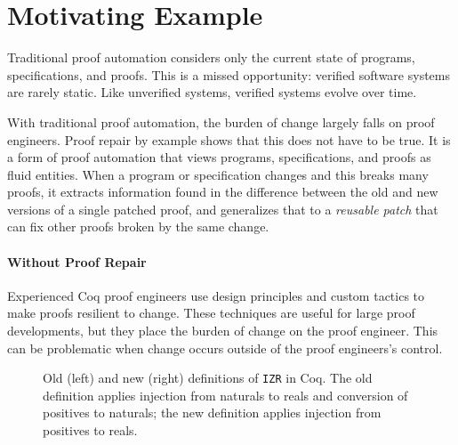 \section{Motivating Example}
\label{sec:patch-motivating}


Traditional proof automation considers only the current state of programs, specifications, and proofs.
This is a missed opportunity: verified software systems are rarely static.
Like unverified systems, verified systems evolve over time.

With traditional proof automation, the burden of change largely falls on proof engineers.
Proof repair by example shows that this does not have to be true.
It is a form of proof automation that views programs, specifications, and proofs as fluid entities.
When a program or specification changes and this breaks many proofs,
it extracts information found in the difference between the old and new versions of a single patched proof,
and generalizes that to a \emph{reusable patch} that can fix other proofs broken by the same change.

\paragraph{Without Proof Repair} Experienced Coq proof engineers use design principles and custom tactics to make proofs
resilient to change. These techniques are useful for large proof developments, but they
place the burden of change on the proof engineer. This can be problematic
when change occurs outside of the proof engineers's control.

\begin{figure*}
\begin{minipage}{0.55\textwidth}
\centering
\lstset{language=coq, aboveskip=0pt, belowskip=0pt}



\end{minipage}
\hfill
\begin{minipage}{0.44\textwidth}
\centering
\lstset{language=coq, aboveskip=0pt, belowskip=0pt}



\end{minipage}
\caption[Caption]{Old (left) and new (right) definitions of \lstinline{IZR} in Coq.
The old definition applies injection from naturals to reals and conversion of positives to
naturals; the new definition applies injection from positives to reals.}
\label{fig:izr}
\end{figure*}

